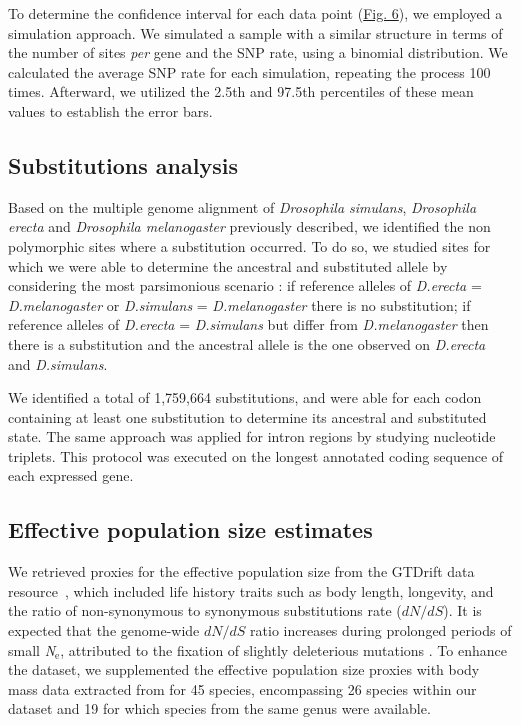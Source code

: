 To determine the confidence interval for each data point (\hyperref[fig:CU6]{Fig. 6}), we employed a simulation approach. We simulated a sample with a similar structure in terms of the number of sites \textit{per} gene and the SNP rate, using a binomial distribution. We calculated the average SNP rate for each simulation, repeating the process 100 times. Afterward, we utilized the 2.5th and 97.5th percentiles of these mean values to establish the error bars.

\subsection{Substitutions analysis}

Based on the multiple genome alignment of \textit{Drosophila simulans}, \textit{Drosophila erecta} and \textit{Drosophila melanogaster} previously described, we identified the non polymorphic sites where a substitution occurred. To do so, we studied sites for which we were able to determine the ancestral and substituted allele by considering the most parsimonious scenario :
if reference alleles of \textit{D.erecta} = \textit{D.melanogaster} or \textit{D.simulans} = \textit{D.melanogaster} there is no substitution;
if reference alleles of \textit{D.erecta} = \textit{D.simulans} but differ from \textit{D.melanogaster} then there is a substitution and the ancestral allele is the one observed on \textit{D.erecta} and \textit{D.simulans}.

We identified a total of 1,759,664 substitutions, and were able for each codon containing at least one substitution to determine its ancestral and substituted state. The same approach was applied for intron regions by studying nucleotide triplets. This protocol was executed on the longest annotated coding sequence of each expressed gene.

\subsection{Effective population size estimates}

We retrieved proxies for the effective population size from the GTDrift data resource~\citep{benitiere_gtdrift_2024}, which included life history traits such as body length, longevity, and the ratio of non-synonymous to synonymous substitutions rate (${dN}/{dS}$). It is expected that the genome-wide ${dN}/{dS}$ ratio increases during prolonged periods of small \textit{N}$_{\text{e}}$, attributed to the fixation of slightly deleterious mutations \citep{ohta_nearly_1992, galtier_adaptive_2016}. To enhance the dataset, we supplemented the effective population size proxies with body mass data extracted from \citet{lynch_divergence_2023} for 45 species, encompassing 26 species within our dataset and 19 for which species from the same genus were available.


